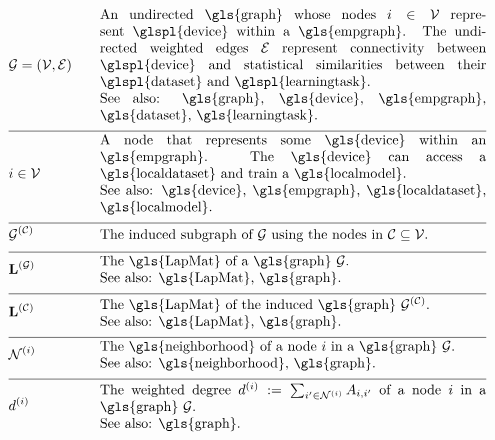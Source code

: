 \begin{align}
 	&\graph = \pair{\nodes}{\edges} & \quad & \parbox{.80\textwidth}{An undirected \gls{graph} whose nodes $\nodeidx \in \nodes$ represent 
		\glspl{device} within a \gls{empgraph}. The undirected weighted edges $\edges$ represent connectivity between 
		\glspl{device} and statistical similarities between their \glspl{dataset} and \glspl{learningtask}.
		\\ See also: \gls{graph}, \gls{device}, \gls{empgraph}, \gls{dataset}, \gls{learningtask}. }\nonumber \\[2mm] \hline \nonumber\\[-5mm]
	&\nodeidx \in \nodes& \quad & \parbox{.80\textwidth}{A node that represents some 
		\gls{device} within an \gls{empgraph}. The \gls{device} can access a \gls{localdataset} and train a \gls{localmodel}.
		\\ See also: \gls{device}, \gls{empgraph}, \gls{localdataset}, \gls{localmodel}. }\nonumber \\[2mm] \hline \nonumber\\[-5mm]
	&\indsubgraph{\graph}{\cluster}& \quad & \parbox{.80\textwidth}{The induced subgraph of $\graph$ using the nodes in $\cluster \subseteq \nodes$. } \nonumber \\[2mm] \hline \nonumber\\[-5mm]
	&\LapMat{\graph}   & \quad & \parbox{.80\textwidth}{The \gls{LapMat} of a \gls{graph} $\graph$.
		\\ See also: \gls{LapMat}, \gls{graph}. }\nonumber \\[2mm] \hline \nonumber\\[-5mm]
	&\LapMat{\cluster}   & \quad & \parbox{.80\textwidth}{The \gls{LapMat} of the induced \gls{graph} $\indsubgraph{\graph}{\cluster}$.
		\\ See also: \gls{LapMat}, \gls{graph}. } \nonumber \\[2mm] \hline \nonumber\\[-5mm]
	 &		\neighbourhood{\nodeidx}  & \quad & \parbox{.80\textwidth}{The \gls{neighborhood} of a node $\nodeidx$ in a \gls{graph} $\graph$.
	 	\\ See also: \gls{neighborhood}, \gls{graph}. }   \nonumber \\[2mm] \hline \nonumber\\[-5mm]
	&\nodedegree{\nodeidx} & \quad & \parbox{.80\textwidth}{The weighted degree $\nodedegree{\nodeidx}\defeq \sum_{\nodeidx' \in \neighbourhood{\nodeidx}} \edgeweight_{\nodeidx,\nodeidx'}$ 
		of a node $\nodeidx$ in a \gls{graph} $\graph$.
		\\ See also: \gls{graph}. }  \nonumber 
\end{align} 

